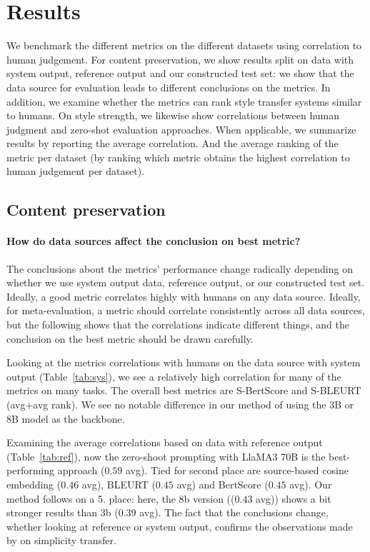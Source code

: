 \section{Results}
We benchmark the different metrics on the different datasets using correlation to human judgement. For content preservation, we show results split on data with system output, reference output and our constructed test set: we show that the data source for evaluation leads to different conclusions on the metrics. In addition, we examine whether the metrics can rank style transfer systems similar to humans. On style strength, we likewise show correlations between human judgment and zero-shot evaluation approaches. When applicable, we summarize results by reporting the average correlation. And the average ranking of the metric per dataset (by ranking which metric obtains the highest correlation to human judgement per dataset). 

\subsection{Content preservation}
\paragraph{How do data sources affect the conclusion on best metric?}
The conclusions about the metrics' performance change radically depending on whether we use system output data, reference output, or our constructed test set. Ideally, a good metric correlates highly with humans on any data source. Ideally, for meta-evaluation, a metric should correlate consistently across all data sources, but the following shows that the correlations indicate different things, and the conclusion on the best metric should be drawn carefully.

Looking at the metrics correlations with humans on the data source with system output (Table~\ref{tab:sys}), we see a relatively high correlation for many of the metrics on many tasks. The overall best metrics are S-BertScore and S-BLEURT (avg+avg rank). We see no notable difference in our method of using the 3B or 8B model as the backbone.

Examining the average correlations based on data with reference output (Table~\ref{tab:ref}), now the zero-shoot prompting with LlaMA3 70B is the best-performing approach ($0.59$ avg). Tied for second place are source-based cosine embedding ($0.46$ avg), BLEURT ($0.45$ avg) and BertScore ($0.45$ avg). Our method follows on a 5. place: here, the 8b version (($0.43$ avg)) shows a bit stronger results than 3b ($0.39$ avg). The fact that the conclusions change, whether looking at reference or system output, confirms the observations made by \citet{scialom-etal-2021-questeval} on simplicity transfer.   

